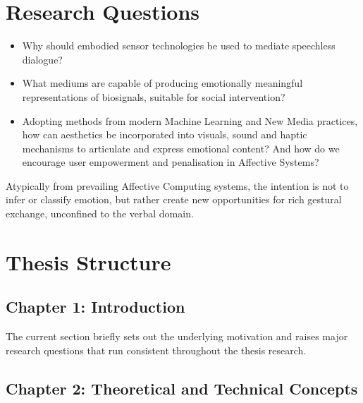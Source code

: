 \section{Research Questions}
\label{sec:research_questions}

\begin{itemize}
    \item Why should embodied sensor technologies be used to mediate speechless dialogue?
    \item What mediums are capable of producing emotionally meaningful representations of biosignals, suitable for social intervention?
    \item Adopting methods from modern Machine Learning and New Media practices, how can aesthetics be incorporated into visuals, sound and haptic mechanisms to articulate and express emotional content? And how do we encourage user empowerment and penalisation in Affective Systems?
\end{itemize}

Atypically from prevailing Affective Computing systems, the intention is not to infer or classify emotion, but rather create new opportunities for rich gestural exchange, unconfined to the verbal domain.

\section{Thesis Structure} %
\label{sec:structure}

\subsection{Chapter 1: Introduction}
The current section briefly sets out the underlying motivation and raises major research questions that run consistent throughout the thesis research.

\subsection{Chapter 2: Theoretical and Technical Concepts}

